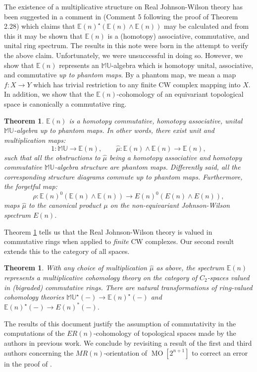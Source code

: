 \documentclass[12pt]{amsart}
\numberwithin{equation}{section}
\theoremstyle{plain}  %
\newtheorem{thm}[equation]{Theorem}
\theoremstyle{definition}  %
\newcommand{\MU}{\mathbb {MU}}
\newcommand{\E}{\mathbb{E}}
\DeclareMathOperator{\MO}{MO}
\begin{document}
The existence of a multiplicative structure on Real Johnson-Wilson theory has been suggested in a comment in \cite{HK01} (Comment 5 following the proof of Theorem 2.28) which claims that $\E(n)^{\star}(\E(n)\wedge\E(n))$ may be calculated and from this it may be shown that $\E(n)$ is a (homotopy) associative, commutative, and unital ring spectrum. The results in this note were born in the attempt to verify the above claim. Unfortunately, we were unsuccessful in doing so. However, we show that $\E(n)$ represents an $\MU$-algebra which is homotopy unital, associative, and commutative \emph{up to phantom maps}. By a phantom map, we mean a map $f: X \longrightarrow Y$ which has trivial restriction to any finite CW complex mapping into $X$. In addition, we show that the $\E(n)$-cohomology of an equivariant topological space is canonically a commutative ring. 

\medskip
\begin{thm}\label{main1}
$\E(n)$ is a homotopy commutative, homotopy associative, unital $\MU$-algebra up to phantom maps. In other words, there exist unit and multiplication maps:
\[ 1: \MU \longrightarrow \E(n), \quad \quad \hat{\mu} : \E(n) \wedge \E(n) \longrightarrow \E(n), \]
such that all the obstructions to $\hat{\mu}$ being a homotopy associative and homotopy commutative $\MU$-algebra structure are phantom maps. Differently said, all the corresponding structure diagrams commute up to phantom maps. Furthermore, the forgetful map:
\[ \rho : \E(n)^0(\E(n) \wedge \E(n)) \longrightarrow E(n)^0(E(n) \wedge E(n)), \]
maps $\hat{\mu}$ to the canonical product $\mu$ on the non-equivariant Johnson-Wilson spectrum $E(n)$. 
\end{thm}

\medskip


Theorem \ref{main1} tells us that the Real Johnson-Wilson theory is valued in commutative rings when applied to \emph{finite} CW complexes. Our second result extends this to the category of all spaces.
\medskip

\begin{thm}\label{main2}
With any choice of multiplication $\hat{\mu}$ as above, the spectrum $\E(n)$ represents a multiplicative cohomology theory on the category of $C_2$-spaces valued in (bigraded) commutative rings. There are natural transformations of ring-valued cohomology theories $\MU^\star(-) \longrightarrow \E(n)^\star(-)$ and $\E(n)^\star(-) \longrightarrow E(n)^*(-)$.
\end{thm}

The results of this document justify the assumption of commutativity in the computations of the $ER(n)$-cohomology of topological spaces made by the authors in previous work. We conclude by revisiting a result of the first and third authors concerning the $MR(n)$-orientation of $\MO[2^{n+1}]$ to correct an error in the proof of \cite[Theorem 1.4]{KW14}.
\end{document}
